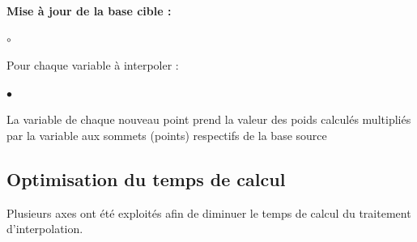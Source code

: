 \vspace{0.4cm}

\textbf{Mise à jour de la base cible :}
\begin{list}{$\circ$}{\leftmargin=0.5cm  \itemsep=0cm}
    \item Pour chaque variable à interpoler :
    \begin{list}{$\bullet$}{\leftmargin=0.5cm  \itemsep=0cm}
        \item La variable de chaque nouveau point prend la valeur des poids calculés multipliés par la variable aux sommets (points) respectifs de la base source
    \end{list}
\end{list}




\newpage


\subsection{Optimisation du temps de calcul}

Plusieurs axes ont été exploités afin de diminuer le temps de calcul du traitement d'interpolation.

